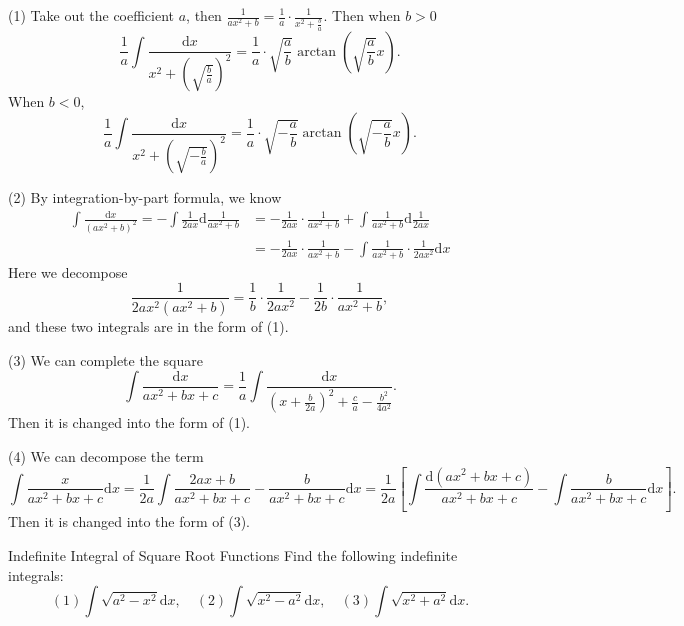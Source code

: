 \begin{solution}
  (1) Take out the coefficient $a$, then $\frac{1}{ax^2 + b} = \frac{1}{a} \cdot
  \frac{1}{x^2 + \frac{b}{a}}$. Then when $b > 0$
  \begin{equation}
    \frac{1}{a} \int \frac{\mathrm{d} x}{x^2 + (\sqrt{\frac{b}{a}})^2}
    = \frac{1}{a}\cdot \sqrt{\frac{a}{b}} \arctan \left( \sqrt{\frac{a}{b}}x \right).
  \end{equation}
  When $b < 0$,
  \begin{equation}
    \frac{1}{a} \int \frac{\mathrm{d} x}{x^2 + (\sqrt{-\frac{b}{a}})^2}
    = \frac{1}{a}\cdot \sqrt{-\frac{a}{b}} \arctan \left( \sqrt{-\frac{a}{b}}x \right).
  \end{equation}

  (2) By integration-by-part formula, we know
  \begin{align}
    \int \frac{\mathrm{d} x}{(ax^2 + b)^2}
    = - \int \frac{1}{2ax} \mathrm{d} \frac{1}{ax^2 + b}
    &= - \frac{1}{2ax} \cdot \frac{1}{ax^2 + b} + \int \frac{1}{ax^2 + b}\mathrm{d} \frac{1}{2ax}\\
    &= - \frac{1}{2ax} \cdot \frac{1}{ax^2 + b} - \int \frac{1}{ax^2 + b} \cdot \frac{1}{2ax^2}\mathrm{d} x
  \end{align}
  Here we decompose
  \begin{equation}
  \frac{1}{2ax^2(ax^2 + b)} = \frac{1}{b} \cdot \frac{1}{2ax^2} - \frac{1}{2b}\cdot \frac{1}{ax^2 + b},
  \end{equation}
  and these two integrals are in the form of (1).

  (3) We can complete the square
  \begin{equation}
    \int \frac{\mathrm{d} x}{ax^2 + bx + c}
    = \frac{1}{a} \int \frac{\mathrm{d} x}{(x + \frac{b}{2a})^2 + \frac{c}{a} - \frac{b^2}{4a^2}}.
  \end{equation}
  Then it is changed into the form of (1).

  (4) We can decompose the term
  \begin{equation}
    \int \frac{x}{ax^2 + bx + c}\mathrm{d} x
    = \frac{1}{2a} \int \frac{2ax + b}{ax^2 + bx + c}
      - \frac{b}{ax^2 + bx + c} \mathrm{d} x
      = \frac{1}{2a} \left[
        \int \frac{\mathrm{d}(ax^2 + bx + c)}{ax^2 + bx + c}
        - \int \frac{b}{ax^2 + bx + c}\mathrm{d}x
      \right].
  \end{equation}
  Then it is changed into the form of (3).
\end{solution}

\begin{example}{Indefinite Integral of Square Root Functions}{}
  Find the following indefinite integrals:
  \begin{equation}
    (1) \int \sqrt{a^2 - x^2} \mathrm{d} x, \quad
    (2) \int \sqrt{x^2 - a^2} \mathrm{d} x, \quad
    (3) \int \sqrt{x^2 + a^2} \mathrm{d} x.
  \end{equation}
\end{example}

